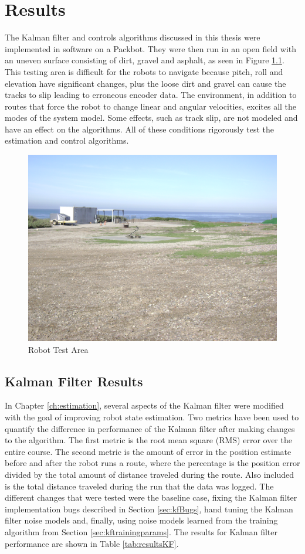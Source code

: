 \chapter{Results}
\label{ch:results}
The Kalman filter and controls algorithms discussed in this thesis were implemented in software on a Packbot. They were then run in an open field with an uneven surface consisting of dirt, gravel and asphalt, as seen in Figure \ref{fig:resultsTestArea}. This testing area is difficult for the robots to navigate because pitch, roll and elevation have significant changes, plus the loose dirt and gravel can cause the tracks to slip leading to erroneous encoder data. The environment, in addition to routes that force the robot to change linear and angular velocities, excites all the modes of the system model. Some effects, such as track slip, are not modeled and have an effect on the algorithms. All of these conditions rigorously test the estimation and control algorithms.

\begin{figure}[ht!]
	\centering
	\includegraphics[width=.75\textwidth]{images/flightFieldTestArea}
	\caption{Robot Test Area}
	\label{fig:resultsTestArea}
\end{figure}

\section{Kalman Filter Results}
\label{sec:kfResults}
In Chapter \ref{ch:estimation}, several aspects of the Kalman filter were modified with the goal of improving robot state estimation. Two metrics have been used to quantify the difference in performance of the Kalman filter after making changes to the algorithm. The first metric is the root mean square (RMS) error over the entire course. The second metric is the amount of error in the position estimate before and after the robot runs a route, where the percentage is the position error divided by the total amount of distance traveled during the route. Also included is the total distance traveled during the run that the data was logged. The different changes that were tested were the baseline case, fixing the Kalman filter implementation bugs described in Section \ref{sec:kfBugs}, hand tuning the Kalman filter noise models and, finally, using noise models learned from the training algorithm from Section \ref{sec:kftrainingparams}. The results for Kalman filter performance are shown in Table \ref{tab:resultsKF}.

